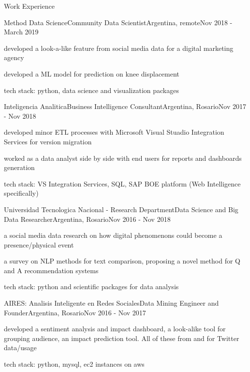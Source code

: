\documentclass{article}
\newlength{\tabin}
\newlength{\secsep}
\newcommand{\lineunder}{\vspace*{-8pt} \\ \hspace*{-6pt} \hrulefill \\ \vspace*{-15pt}}
\newenvironment{tabbedsection}[1]{
  \begin{list}{}{
      \setlength{\itemsep}{0pt}
      \setlength{\labelsep}{0pt}
      \setlength{\labelwidth}{0pt}
      \setlength{\leftmargin}{\tabin}
      \setlength{\rightmargin}{\tabin}
      \setlength{\listparindent}{0pt}
      \setlength{\parsep}{0pt}
      \setlength{\parskip}{0pt}
      \setlength{\partopsep}{0pt}
      \setlength{\topsep}{#1}
    }
  \item[]
}{\end{list}}
\newenvironment{resume_section}[1]{
  \filbreak
  \vspace{1\secsep}
  \textsc{\large#1}
  \lineunder
  \begin{tabbedsection}{\secsep}
}{\end{tabbedsection}}
\newenvironment{subitems}{
  \renewcommand{\labelitemi}{-}
  \begin{itemize}
      \setlength{\labelsep}{1em}
}{\end{itemize}}
\newenvironment{resume_employer}[4]{
  \vspace{\secsep}
  \textbf{#1} \\ 
  \indent {\small #2} \hfill {\footnotesize#3 (#4)}
  \begin{tabbedsection}{0pt}
  \begin{subitems}
}{\end{subitems}\end{tabbedsection}}
\begin{document}
\begin{resume_section}{Work Experience}
  \begin{resume_employer}{Method Data Science}{Community Data Scientist}{Argentina, remote}{Nov 2018 - March 2019}
    \item developed a look-a-like feature from social media data for a digital marketing agency
    \item developed a ML model for prediction on knee displacement
    \item tech stack: python, data science and visualization packages
  \end{resume_employer}
  
  \begin{resume_employer}{Inteligencia Analitica}{Business Intelligence Consultant}{Argentina, Rosario}{Nov 2017 - Nov 2018}
    \item developed minor ETL processes with Microsoft Visual Stuadio Integration Services for version migration
    \item worked as a data analyst side by side with end users for reports and dashboards generation
    \item tech stack: VS Integration Services, SQL, SAP BOE platform (Web Intelligence specifically)
  \end{resume_employer}
  
  \begin{resume_employer}{Universidad Tecnologica Nacional - Research Department}{Data Science and Big Data Researcher}{Argentina, Rosario}{Nov 2016 - Nov 2018}
    \item a social media data research on how digital phenomenons could become a presence/physical event
    \item a survey on NLP methods for text comparison, proposing a novel method for Q and A recommendation systems
    \item tech stack: python and scientific packages for data analysis
  \end{resume_employer}
  
  \begin{resume_employer}{AIRES: Analisis Inteligente en Redes Sociales}{Data Mining Engineer and Founder}{Argentina, Rosario}{Nov 2016 - Nov 2017}
    \item developed a sentiment analysis and impact dashboard, a look-alike tool for grouping audience, an impact prediction tool. All of these from and for Twitter data/usage
    \item tech stack: python, mysql, ec2 instances on aws
  \end{resume_employer}  
\end{resume_section}
\end{document}
